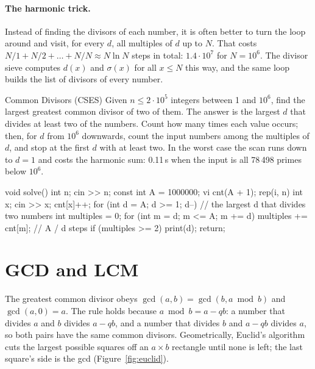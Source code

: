 \paragraph{The harmonic trick.} Instead of finding the divisors of each number, it is often better to turn the loop around and visit,
for every $d$, all multiples of $d$ up to $N$. That costs $N/1 + N/2 + \dots + N/N \approx N \ln N$ steps in total: $1.4 \cdot 10^7$
for $N = 10^6$. The divisor sieve computes $d(x)$ and $\sigma(x)$ for all $x \le N$ this way, and the same loop builds the list of
divisors of every number.


\begin{problem}{Common Divisors (CSES)}
Given $n \le 2 \cdot 10^5$ integers between 1 and $10^6$, find the largest greatest common divisor of two of them.
\solution The answer is the largest $d$ that divides at least two of the numbers. Count how many times each value occurs; then, for
$d$ from $10^6$ downwards, count the input numbers among the multiples of $d$, and stop at the first $d$ with at least two. In the
worst case the scan runs down to $d = 1$ and costs the harmonic sum: 0.11\,s when the input is all 78\,498 primes below $10^6$.
\end{problem}

\begin{code}
void solve() {
    int n;
    cin >> n;
    const int A = 1000000;
    vi cnt(A + 1);
    rep(i, n) {
        int x;
        cin >> x;
        cnt[x]++;
    }
    for (int d = A; d >= 1; d--) {  // the largest d that divides two numbers
        int multiples = 0;
        for (int m = d; m <= A; m += d) multiples += cnt[m];  // A / d steps
        if (multiples >= 2) {
            print(d);
            return;
        }
    }
}
\end{code}

\section[GCD and LCM]{GCD and LCM \hfill \silver}\label{sec:gcd}

The greatest common divisor obeys $\gcd(a, b) = \gcd(b, a \bmod b)$ and $\gcd(a, 0) = a$. The rule holds because $a \bmod b = a - qb$:
a number that divides $a$ and $b$ divides $a - qb$, and a number that divides $b$ and $a - qb$ divides $a$, so both pairs have the same
common divisors. Geometrically, Euclid's algorithm cuts the largest possible squares off an $a \times b$ rectangle until none is left;
the last square's side is the gcd (Figure~\ref{fig:euclid}).

